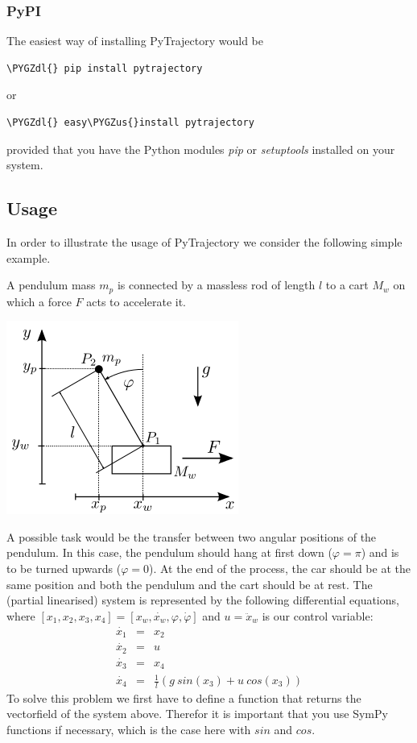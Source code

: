 \documentclass[letterpaper,10pt,english]{sphinxmanual}
\def\PYGZus{\char`\_}
\def\PYGZdl{\char`\$}
\begin{document}
\subsubsection{PyPI}
\label{guide/start:pypi}
The easiest way of installing PyTrajectory would be

\begin{Verbatim}[commandchars=\\\{\}]
\PYGZdl{} pip install pytrajectory
\end{Verbatim}

or

\begin{Verbatim}[commandchars=\\\{\}]
\PYGZdl{} easy\PYGZus{}install pytrajectory
\end{Verbatim}

provided that you have the Python modules \emph{pip} or \emph{setuptools} installed on your system.


\subsection{Usage}
\label{guide/start:usage}
In order to illustrate the usage of PyTrajectory we consider the following simple example.

A pendulum mass \(m_p\) is connected by a massless rod of length \(l\) to a cart \(M_w\)
on which a force \(F\) acts to accelerate it.

\includegraphics{inv_pendulum.png}

A possible task would be the transfer between two angular positions of the pendulum.
In this case, the pendulum should hang at first down (\(\varphi = \pi\)) and is
to be turned upwards (\(\varphi = 0\)). At the end of the process, the car should be at
the same position and both the pendulum and the cart should be at rest.
The (partial linearised) system is represented by the following differential equations,
where \([x_1, x_2, x_3, x_4] = [x_w, \dot{x_w}, \varphi, \dot{\varphi}]\) and
\(u = \ddot{x}_w\) is our control variable:
\begin{eqnarray*}
    \dot{x_1} & = & x_2 \\
    \dot{x_2} & = & u \\
    \dot{x_3} & = & x_4 \\
    \dot{x_4} & = & \frac{1}{l}(g\ sin(x_3) + u\ cos(x_3))
\end{eqnarray*}
To solve this problem we first have to define a function that returns the vectorfield of
the system above. Therefor it is important that you use SymPy functions if necessary, which is
the case here with \(sin\) and \(cos\).
\end{document}
